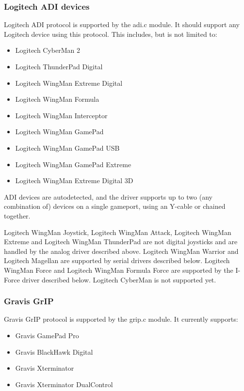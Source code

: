 \documentclass[a4paper,8pt,english]{sphinxmanual}
\begin{document}
\subsubsection{Logitech ADI devices}
\label{input/joydev/joystick:logitech-adi-devices}
Logitech ADI protocol is supported by the adi.c module. It should support
any Logitech device using this protocol. This includes, but is not limited
to:
\begin{itemize}
\item {} 
Logitech CyberMan 2

\item {} 
Logitech ThunderPad Digital

\item {} 
Logitech WingMan Extreme Digital

\item {} 
Logitech WingMan Formula

\item {} 
Logitech WingMan Interceptor

\item {} 
Logitech WingMan GamePad

\item {} 
Logitech WingMan GamePad USB

\item {} 
Logitech WingMan GamePad Extreme

\item {} 
Logitech WingMan Extreme Digital 3D

\end{itemize}

ADI devices are autodetected, and the driver supports up to two (any
combination of) devices on a single gameport, using an Y-cable or chained
together.

Logitech WingMan Joystick, Logitech WingMan Attack, Logitech WingMan
Extreme and Logitech WingMan ThunderPad are not digital joysticks and are
handled by the analog driver described above. Logitech WingMan Warrior and
Logitech Magellan are supported by serial drivers described below.  Logitech
WingMan Force and Logitech WingMan Formula Force are supported by the
I-Force driver described below. Logitech CyberMan is not supported yet.


\subsubsection{Gravis GrIP}
\label{input/joydev/joystick:gravis-grip}
Gravis GrIP protocol is supported by the grip.c module. It currently
supports:
\begin{itemize}
\item {} 
Gravis GamePad Pro

\item {} 
Gravis BlackHawk Digital

\item {} 
Gravis Xterminator

\item {} 
Gravis Xterminator DualControl

\end{itemize}
\end{document}
